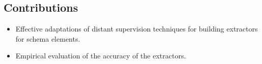 
\subsection{Contributions}

\begin{itemize}
\item Effective adaptations of distant supervision techniques for building extractors for schema elements.
\item Empirical evaluation of the accuracy of the extractors. 
\end{itemize}

